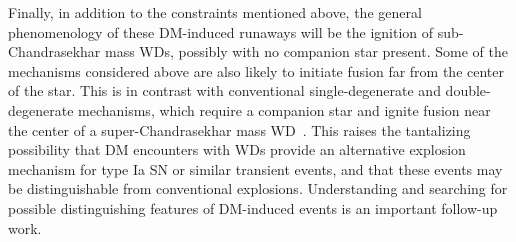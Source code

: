 \documentclass[preprintnumbers,amsmath,amssymb,prd,superscriptaddress]{revtex4}
\begin{document}
Finally, in addition to the constraints mentioned above, the general phenomenology of these DM-induced runaways will be the ignition of sub-Chandrasekhar mass WDs, possibly with no companion star present.
Some of the mechanisms considered above are also likely to initiate fusion far from the center of the star. 
This is in contrast with conventional single-degenerate and double-degenerate mechanisms, which require a companion star and ignite fusion near the center of a super-Chandrasekhar mass WD~\cite{Maoz:2012}.  
This raises the tantalizing possibility that DM encounters with WDs provide an alternative explosion mechanism for type Ia SN or similar transient events, and that these events may be distinguishable from conventional explosions. 
Understanding and searching for possible distinguishing features of DM-induced events is an important follow-up work. 
\end{document}
